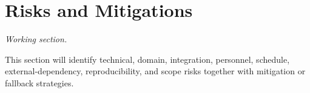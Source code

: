 \section{Risks and Mitigations}
\label{sec:risks}

\textit{Working section.}

This section will identify technical, domain, integration, personnel, schedule,
external-dependency, reproducibility, and scope risks together with mitigation
or fallback strategies.
